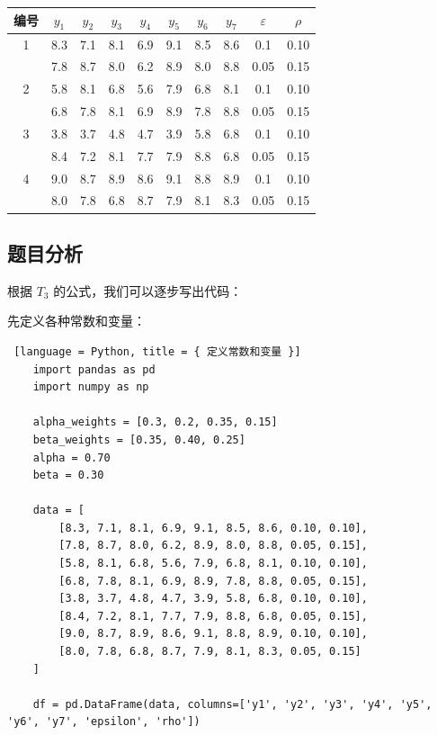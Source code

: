 \begin{table}[H]
\centering
\begin{tabular}{cccccccccc}
\toprule
编号 & $y_1$ & $y_2$ & $y_3$ & $y_4$ & $y_5$ & $y_6$ & $y_7$ & $\varepsilon$ & $\rho$ \\
\midrule
1 & 8.3 & 7.1 & 8.1 & 6.9 & 9.1 & 8.5 & 8.6 & 0.1 & 0.10 \\
  & 7.8 & 8.7 & 8.0 & 6.2 & 8.9 & 8.0 & 8.8 & 0.05 & 0.15 \\
\midrule
2 & 5.8 & 8.1 & 6.8 & 5.6 & 7.9 & 6.8 & 8.1 & 0.1 & 0.10 \\
  & 6.8 & 7.8 & 8.1 & 6.9 & 8.9 & 7.8 & 8.8 & 0.05 & 0.15 \\
\midrule
3 & 3.8 & 3.7 & 4.8 & 4.7 & 3.9 & 5.8 & 6.8 & 0.1 & 0.10 \\
  & 8.4 & 7.2 & 8.1 & 7.7 & 7.9 & 8.8 & 6.8 & 0.05 & 0.15 \\
\midrule
4 & 9.0 & 8.7 & 8.9 & 8.6 & 9.1 & 8.8 & 8.9 & 0.1 & 0.10 \\
  & 8.0 & 7.8 & 6.8 & 8.7 & 7.9 & 8.1 & 8.3 & 0.05 & 0.15 \\
\bottomrule
\end{tabular}
\end{table}

\subsection{题目分析}

根据 \( T_{3} \) 的公式，我们可以逐步写出代码：

先定义各种常数和变量：

\begin{lstlisting} [language = Python, title = { 定义常数和变量 }]
    import pandas as pd
    import numpy as np

    alpha_weights = [0.3, 0.2, 0.35, 0.15]
    beta_weights = [0.35, 0.40, 0.25]
    alpha = 0.70
    beta = 0.30

    data = [
        [8.3, 7.1, 8.1, 6.9, 9.1, 8.5, 8.6, 0.10, 0.10],
        [7.8, 8.7, 8.0, 6.2, 8.9, 8.0, 8.8, 0.05, 0.15],
        [5.8, 8.1, 6.8, 5.6, 7.9, 6.8, 8.1, 0.10, 0.10],
        [6.8, 7.8, 8.1, 6.9, 8.9, 7.8, 8.8, 0.05, 0.15],
        [3.8, 3.7, 4.8, 4.7, 3.9, 5.8, 6.8, 0.10, 0.10],
        [8.4, 7.2, 8.1, 7.7, 7.9, 8.8, 6.8, 0.05, 0.15],
        [9.0, 8.7, 8.9, 8.6, 9.1, 8.8, 8.9, 0.10, 0.10],
        [8.0, 7.8, 6.8, 8.7, 7.9, 8.1, 8.3, 0.05, 0.15] 
    ]

    df = pd.DataFrame(data, columns=['y1', 'y2', 'y3', 'y4', 'y5', 'y6', 'y7', 'epsilon', 'rho'])
\end{lstlisting}

